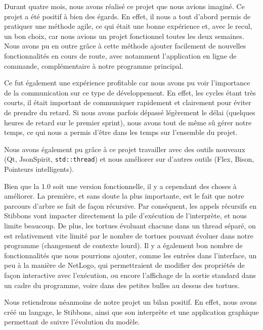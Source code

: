 Durant quatre mois, nous avons réalisé ce projet que nous avions imaginé.
Ce projet a été positif à bien des égards. En effet, il nous a tout d'abord permis de pratiquer une méthode agile, ce qui était une bonne expérience et, avec le recul, un bon choix, car nous avions un projet fonctionnel toutes les deux semaines.
Nous avons pu en outre grâce à cette méthode ajouter facilement de nouvelles fonctionnalités en cours de route, avec notamment l'application en ligne de commande, complémentaire à notre programme principal.

Ce fut également une expérience profitable car nous avons pu voir l'importance de la communication sur ce type de développement. En effet, les cycles étant très courts, il était important de communiquer rapidement et clairement pour éviter de prendre du retard. Si nous avons parfois dépassé légèrement le délai (quelques heures de retard sur le premier sprint), nous avons tout de même sû gérer notre temps, ce qui nous a permis d'être dans les temps sur l'ensemble du projet.

Nous avons également pu grâce à ce projet travailler avec des outils nouveaux (Qt, JsonSpirit, \verb|std::thread|) et nous améliorer sur d'autres outils (Flex, Bison, Pointeurs intelligents).

Bien que la 1.0 soit une version fonctionnelle, il y a cependant des choses à améliorer. La première, et sans doute la plus importante, est le fait que notre parcours d'arbre se fait de façon récursive. Par conséquent, les appels récursifs en Stibbons vont impacter directement la pile d'exécution de l'interprète, et nous limite beaucoup.
De plus, les tortues évoluant chacune dans un thread séparé, on est relativement vite limité par le nombre de tortues pouvant évoluer dans notre programme (changement de contexte lourd).
Il y a également bon nombre de fonctionnalités que nous pourrions ajouter, comme les entrées dans l'interface, un peu à la manière de NetLogo, qui permettraient de modifier des propriétés de façon interactive avec l'exécution, ou encore l'affichage de la sortie standard dans un cadre du programme, voire dans des petites bulles au dessus des tortues.

Nous retiendrons néanmoins de notre projet un bilan positif. En effet, nous avons créé un langage, le Stibbons, ainsi que son interprète et une application graphique permettant de suivre l'évolution du modèle.
